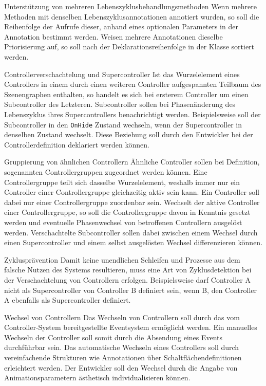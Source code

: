 \begin{freq}{Unterstützung von mehreren Lebenszyklusbehandlungsmethoden}
	Wenn mehrere Methoden mit denselben Lebenszyklusannotationen annotiert wurden, so soll die Reihenfolge der Aufrufe dieser, anhand eines optionalen Parameters in der Annotation bestimmt werden. Weisen mehrere Annotationen dieselbe Priorisierung auf, so soll nach der Deklarationsreihenfolge in der Klasse sortiert werden.
\end{freq}
\begin{freq}{Controllerverschachtelung und Supercontroller}
	Ist das Wurzelelement eines Controllers in einem durch einen weiteren Controller aufgespannten Teilbaum des Szenengraphen enthalten, so handelt es sich bei ersterem Controller um einen Subcontroller des Letzteren. Subcontroller sollen bei Phasenänderung des Lebenszyklus ihres Supercontrollers benachrichtigt werden. Beispielsweise soll der Subcontroller in den \texttt{OnHide} Zustand wechseln, wenn der Supercontroller in denselben Zustand wechselt. Diese Beziehung soll durch den Entwickler bei der Controllerdefinition deklariert werden können.
\end{freq}
\begin{freq}{Gruppierung von ähnlichen Controllern}
	Ähnliche Controller sollen bei Definition, sogenannten Controllergruppen zugeordnet werden können. Eine Controllergruppe teilt sich dasselbe Wurzelelement, weshalb immer nur ein Controller einer Controllergruppe gleichzeitig aktiv sein kann. Ein Controller soll dabei nur einer Controllergruppe zuordenbar sein. Wechselt der aktive Controller einer Controllergruppe, so soll die Controllergruppe davon in Kenntnis gesetzt werden und eventuelle Phasenwechsel von betroffenen Controllern ausgelöst werden. Verschachtelte Subcontroller sollen dabei zwischen einem Wechsel durch einen Supercontroller und einem selbst ausgelösten Wechsel differenzieren können.
\end{freq}
\begin{freq}{Zyklusprävention}
	Damit keine unendlichen Schleifen und Prozesse aus dem falsche Nutzen des Systems resultieren, muss eine Art von Zyklusdetektion bei der Verschachtelung von Controllern erfolgen. Beispielsweise darf Controller A nicht als Supercontroller von Controller B definiert sein, wenn B, den Controller A ebenfalls als Supercontroller definiert.
\end{freq}
\begin{freq}{Wechsel von Controllern}
	Das Wechseln von Controllern soll durch das vom Controller-System bereitgestellte Eventsystem ermöglicht werden. Ein manuelles Wechseln der Controller soll somit durch die Absendung eines Events durchführbar sein. Das automatische Wechseln eines Controllers soll durch vereinfachende Strukturen wie Annotationen über Schaltflächendefinitionen erleichtert werden. Der Entwickler soll den Wechsel durch die Angabe von Animationsparametern ästhetisch individualisieren können.
\end{freq}
